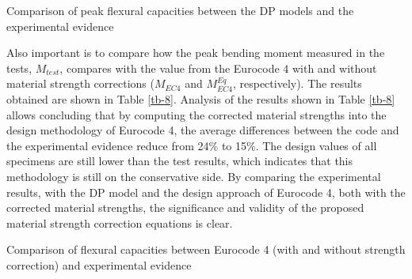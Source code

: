 \documentclass[12pt,a4]{article}
\begin{document}
	\par
	\begin{table}
		\caption{Comparison of peak flexural capacities between the DP models and the experimental evidence}
		\label{tb-7}
	\end{table}
	\par
	Also important is to compare how the peak bending moment measured in the tests, $M_{test}$, compares with the value from the Eurocode 4 with and without material strength corrections ($M_{EC4}$ and $M_{EC4}^{Eq}$, respectively). The results obtained are shown in Table \ref{tb-8}. Analysis of the results shown in Table \ref{tb-8} allows concluding that by computing the corrected material strengths into the design methodology of Eurocode 4, the average differences between the code and the experimental evidence reduce from 24\% to 15\%. The design values of all specimens are still lower than the test results, which indicates that this methodology is still on the conservative side. By comparing the experimental results, with the DP model and the design approach of Eurocode 4, both with the corrected material strengths, the significance and validity of the proposed material strength correction equations is clear.
	\par
	\begin{table}
		\caption{Comparison of flexural capacities between Eurocode 4 (with and without strength correction) and experimental evidence}
		\label{tb-8}
	\end{table}
	\par
\end{document}
